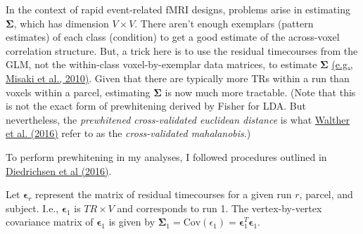 \documentclass{article}\usepackage[]{graphicx}\usepackage[]{color}
\begin{document}
In the context of rapid event-related fMRI designs, problems arise in estimating $\mathbf{\Sigma}$, which has dimension $V \times V$.
There aren't enough exemplars (pattern estimates) of each class (condition) to get a good estimate of the across-voxel correlation structure.
But, a trick here is to use the residual timecourses from the GLM, not the within-class voxel-by-exemplar data matrices, to estimate $\mathbf{\Sigma}$ \href{https://doi.org/10.1016/j.neuroimage.2010.05.051}{(e.g., Misaki et al., 2010)}.
Given that there are typically more TRs within a run than voxels within a parcel, estimating $\mathbf{\Sigma}$ is now much more tractable.
(Note that this is not the exact form of prewhitening derived by Fisher for LDA.
But nevertheless, the \textit{prewhitened cross-validated euclidean distance} is what \href{https://doi.org/10.1016/j.neuroimage.2015.12.012}{Walther et al. (2016)} refer to as the \textit{cross-validated mahalanobis}.)

To perform prewhitening in my analyses, I followed procedures outlined in \href{https://arxiv.org/abs/1607.01371}{Diedrichsen et al (2016)}.

Let $\mathbf{\epsilon}_r$ represent the matrix of residual timecourses for a given run $r$, parcel, and subject.
I.e., $\mathbf{\epsilon}_1$ is $TR \times V$ and corresponds to run 1.
The vertex-by-vertex covariance matrix of $\mathbf{\epsilon}_1$ is given by $\mathbf{\Sigma}_1 = \text{Cov}(\epsilon_1) = \mathbf{\epsilon}_1^T\mathbf{\epsilon}_1$.
\end{document}
